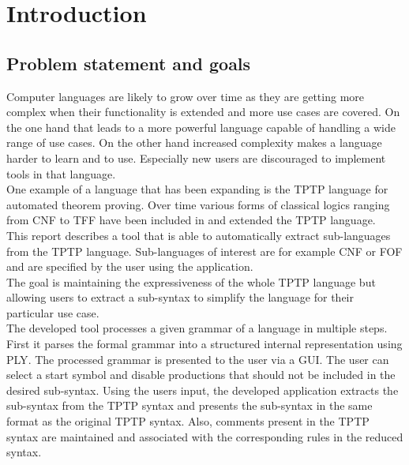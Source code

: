 
\chapter{Introduction}\label{cha:Introduction}

\section{Problem statement and goals}\label{sec:Aufgabenstellung}
Computer languages are likely to grow over time as they are getting more complex when their functionality is extended and more use cases are covered.
On the one hand that leads to a more powerful language capable of handling a wide range of use cases.
On the other hand increased complexity makes a language harder to learn and to use. Especially new users are discouraged to implement tools in that language.\\
One example of a language that has been expanding is the \ac{TPTP} language for automated theorem proving. Over time
various forms of classical logics ranging from \ac{CNF} to \ac{TFF} have been included in and extended the \ac{TPTP} language. \\
This report describes a tool that is able to automatically extract sub-languages from the \ac{TPTP} language. Sub-languages of interest are for example \ac{CNF} or \ac{FOF} and are specified by the user using the application.\\
The goal is maintaining the expressiveness of the whole \ac{TPTP} language but allowing users to extract a sub-syntax to simplify the language for their particular use case. \\
The developed tool processes a given grammar of a language in multiple steps.
First it parses the formal grammar into a structured internal representation using \ac{PLY}.
The processed grammar is presented to the user via a GUI. The user can select a start symbol and disable productions that should not be included in the desired sub-syntax.
Using the users input, the developed application extracts the sub-syntax from the \ac{TPTP} syntax and presents the sub-syntax in the same format as the original \ac{TPTP} syntax.
Also, comments present in the \ac{TPTP} syntax are maintained and associated with the corresponding rules in the reduced syntax.
